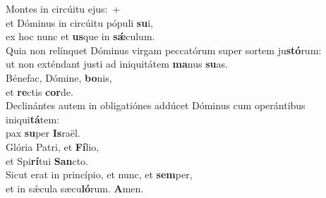 \evenverse Montes in circúitu ejus:~+\\\evenverse  et Dóminus in circúitu pópuli \textbf{su}i,~\*\\
\evenverse ex hoc nunc et \textbf{us}que in \textbf{sǽ}culum.\\
\oddverse Quia non relínquet Dóminus virgam peccatórum super sortem ju\textbf{stó}rum:~\*\\
\oddverse ut non exténdant justi ad iniquitátem \textbf{ma}nus \textbf{su}as.\\
\evenverse Bénefac, Dómine, \textbf{bo}nis,~\*\\
\evenverse et \textbf{re}ctis \textbf{cor}de.\\
\oddverse Declinántes autem in obligatiónes addúcet Dóminus cum operántibus iniqui\textbf{tá}tem:~\*\\
\oddverse pax \textbf{su}per \textbf{Is}raël.\\
\evenverse Glória Patri, et \textbf{Fí}lio,~\*\\
\evenverse et Spi\textbf{rí}tui \textbf{San}cto.\\
\oddverse Sicut erat in princípio, et nunc, et \textbf{sem}per,~\*\\
\oddverse et in sǽcula sæcu\textbf{ló}rum. \textbf{A}men.\\
